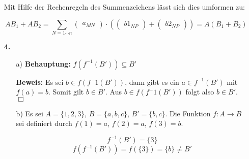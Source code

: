 \documentclass[a4paper,10pt]{scrartcl}
\begin{document}
\begin{enumerate}
        Mit Hilfe der Rechenregeln des Summenzeichens lässt sich dies umformen zu:

        $$
            AB_1 + AB_2 =
            \sum_{N = 1 \cdots n}
            \begin{pmatrix}a_{MN}\end{pmatrix} \cdot \left(
            \begin{pmatrix}b1_{NP}\end{pmatrix} +
            \begin{pmatrix}b2_{NP}\end{pmatrix} \right)
            = A(B_1 + B_2)
        $$

    \item[\textbf{4.}]
        \begin{enumerate}
            \item[a)]
                \textbf{Behauptung:}
                    $f(f^{-1}(B')) \subseteq B'$

                \textbf{Beweis:}
                    Es sei $b \in f(f^-1(B'))$, dann gibt es ein $a \in f^{-1}(B')$ mit
                    $f(a) = b$. Somit gilt $b \in B'$. Aus $b \in f(f^-1(B'))$ folgt also
                    $b \in B'$. $\Box$

            \item[b)]
                Es sei $A=\{1,2,3\}$, $B=\{a,b,c\}$, $B'=\{b,c\}$. Die Funktion $f: A \rightarrow B$ sei
                definiert durch $f(1) = a$, $f(2) = a$, $f(3) = b$.

                $$f^{-1}(B')= \{3\}$$
                $$f(f^{-1}(B')) = f(\{3\}) = \{b\} \neq B'$$
        \end{enumerate}
\end{enumerate}
\end{document}
